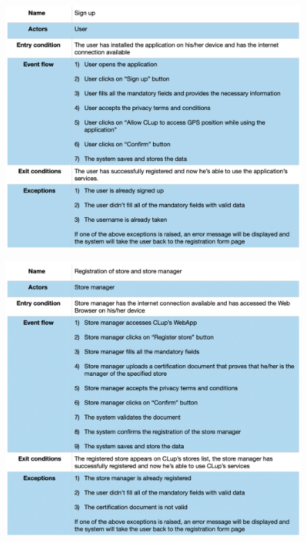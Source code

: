 \documentclass{article}
\begin{document}
\begin{figure}[H]
  \includegraphics[width=\linewidth]{SignUpUseCase.png}
  
\end{figure}

\begin{figure}[H]
  \includegraphics[width=\linewidth]{RegistrationStoreUseCase.png}
  
\end{figure}
\end{document}

